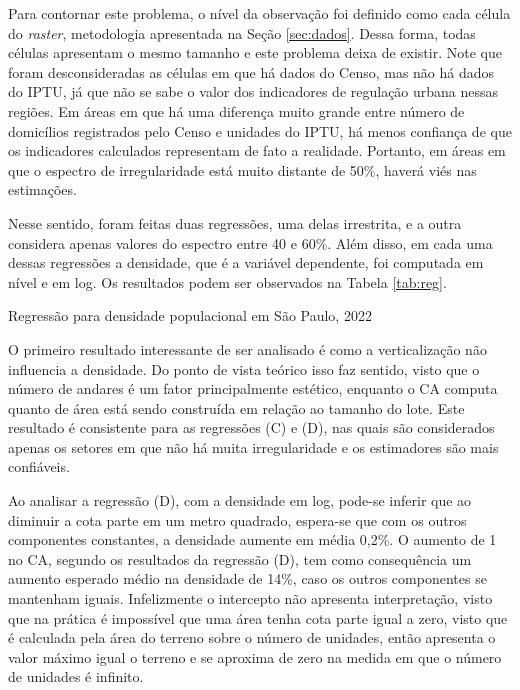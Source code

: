 Para contornar este problema, o nível da observação foi definido como cada célula do \textit{raster}, metodologia apresentada na Seção \ref{sec:dados}. Dessa forma, todas células apresentam o mesmo tamanho e este problema deixa de existir. Note que foram desconsideradas as células em que há dados do Censo, mas não há dados do IPTU, já que não se sabe o valor dos indicadores de regulação urbana nessas regiões. Em áreas em que há uma diferença muito grande entre número de domicílios registrados pelo Censo e unidades do IPTU, há menos confiança de que os indicadores calculados representam de fato a realidade. Portanto, em áreas em que o espectro de irregularidade está muito distante de 50\%, haverá viés nas estimações. 

Nesse sentido, foram feitas duas regressões, uma delas irrestrita, e a outra considera apenas valores do espectro entre 40 e 60\%. Além disso, em cada uma dessas regressões a densidade, que é a variável dependente, foi computada em nível e em log. Os resultados podem ser observados na Tabela \ref{tab:reg}. 

\begin{table}[h]
    \caption{Regressão para densidade populacional em São Paulo, 2022}
    
    \label{tab:reg}
    \addtocounter{table}{-1}
\end{table}

O primeiro resultado interessante de ser analisado é como a verticalização não influencia a densidade. Do ponto de vista teórico isso faz sentido, visto que o número de andares é um fator principalmente estético, enquanto o CA computa quanto de área está sendo construída em relação ao tamanho do lote. Este resultado é consistente para as regressões (C) e (D), nas quais são considerados apenas os setores em que não há muita irregularidade e os estimadores são mais confiáveis. 

Ao analisar a regressão (D), com a densidade em log, pode-se inferir que ao diminuir a cota parte em um metro quadrado, espera-se que com os outros componentes constantes, a densidade aumente em média 0,2\%. O aumento de 1 no CA, segundo os resultados da regressão (D), tem como consequência um aumento esperado médio na densidade de 14\%, caso os outros componentes se mantenham iguais. Infelizmente o intercepto não apresenta interpretação, visto que na prática é impossível que uma área tenha cota parte igual a zero, visto que é calculada pela área do terreno sobre o número de unidades, então apresenta o valor máximo igual o terreno e se aproxima de zero na medida em que o número de unidades é infinito. 

